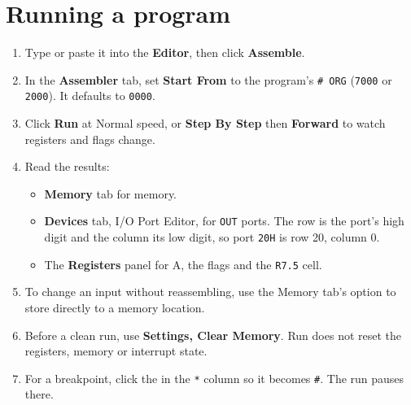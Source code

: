 \documentclass[11pt,a4paper]{article}
\newcommand{\code}[1]{\texttt{#1}}
\begin{document}
\section*{Running a program}
\begin{enumerate}[leftmargin=*]
\item Type or paste it into the \textbf{Editor}, then click \textbf{Assemble}.
\item In the \textbf{Assembler} tab, set \textbf{Start From} to the program's \code{\# ORG} (\code{7000} or \code{2000}). It defaults to \code{0000}.
\item Click \textbf{Run} at Normal speed, or \textbf{Step By Step} then \textbf{Forward} to watch registers and flags change.
\item Read the results:
\begin{itemize}
\item \textbf{Memory} tab for memory.
\item \textbf{Devices} tab, I/O Port Editor, for \code{OUT} ports. The row is the port's high digit and the column its low digit, so port \code{20H} is row 20, column 0.
\item The \textbf{Registers} panel for A, the flags and the \code{R7.5} cell.
\end{itemize}
\item To change an input without reassembling, use the Memory tab's option to store directly to a memory location.
\item Before a clean run, use \textbf{Settings, Clear Memory}. Run does not reset the registers, memory or interrupt state.
\item For a breakpoint, click the \code{\textsurd} in the \code{*} column so it becomes \code{\#}. The run pauses there.
\end{enumerate}
\end{document}
